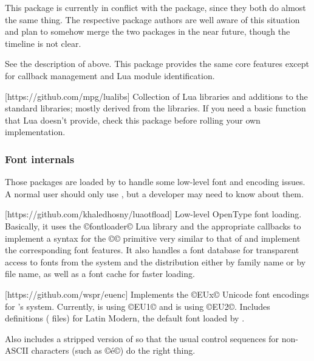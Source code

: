 \documentclass{lltxdoc}
\begin{document}
 This package is currently in conflict with the 
package, since they both do almost the same thing. The respective package
authors are well aware of this situation and plan to somehow merge the two
packages in the near future, though the timeline is not clear.

See the description of  above. This package provides the same
core features except for callback management and Lua module identification.

[https://github.com/mpg/lualibs]
Collection of Lua libraries and additions to the standard libraries; mostly
derived from the \context libraries. If you need a basic function that Lua
doesn't provide, check this package before rolling your own implementation.

\subsubsection{Font internals}\label{fontint}

Those packages are loaded by  to handle some low-level font and
encoding issues. A normal user should only use , but a developer
may need to know about them.

[https://github.com/khaledhosny/luaotfload]
Low-level OpenType font loading. Basically, it uses the ©fontloader© Lua
library and the appropriate callbacks to implement a syntax for the ©\font©
primitive very similar to that of \xetex and implement the corresponding font
features. It also handles a font database for transparent access to fonts from
the system and the \tex distribution either by family name or by file name, as
well as a font cache for faster loading.

[https://github.com/wspr/euenc]
Implements the ©EUx© Unicode font encodings for \latex's  system.
Currently, \xelatex is using ©EU1© and \luatex is using ©EU2©. Includes
definitions ( files) for Latin Modern, the default font loaded by
.

Also includes a stripped version of  so that the usual control
sequences for non-ASCII characters (such as ©\'e©) do the right thing.
\end{document}
